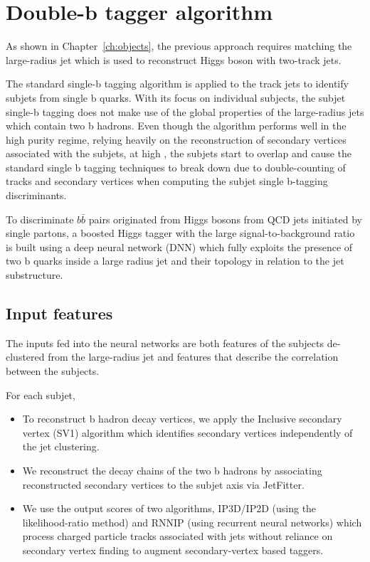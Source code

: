 \section{Double-b tagger algorithm}
\label{sec:algo}

\par As shown in Chapter~\ref{ch:objects}, the previous approach requires matching the large-radius jet which is used to reconstruct Higgs boson with two-track jets.
\par The standard single-b tagging algorithm is applied to the track jets to identify subjets from single b quarks. With its focus on individual subjects, the subjet single-b tagging does not make use of the global properties of the large-radius jets which contain two b hadrons. Even though the algorithm performs well in the high purity regime, relying heavily on the reconstruction of secondary vertices associated with the subjets, at high \pt, the subjets start to overlap and cause the standard single b tagging techniques to break down due to double-counting of tracks and secondary vertices when computing the subjet single b-tagging discriminants. 
\par To discriminate $b\bar{b}$ pairs originated from Higgs bosons from QCD jets initiated by single partons, a boosted Higgs tagger with the large signal-to-background ratio is built using a deep neural network (DNN) which fully exploits the presence of two b quarks inside a large radius jet and their topology in relation to the jet substructure. 

\subsection{Input features}

\par The inputs fed into the neural networks are both features of the subjects de-clustered from the large-radius jet and features that describe the correlation between the subjects.
\par For each subjet,
\begin{itemize}
    \item To reconstruct b hadron decay vertices, we apply the Inclusive secondary vertex (SV1) algorithm which identifies secondary vertices independently of the jet clustering.
    \item We reconstruct the decay chains of the two b hadrons by associating reconstructed secondary vertices to the subjet axis via JetFitter.
    \item We use the output scores of two algorithms, IP3D/IP2D (using the likelihood-ratio method) and RNNIP (using recurrent neural networks) which process charged particle tracks associated with jets without reliance on secondary vertex finding to augment secondary-vertex based taggers. 
\end{itemize}

